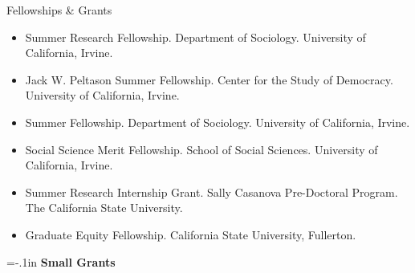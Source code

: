 \documentclass{resume} %
\newenvironment{hangt}[1]
 {\par\vspace{-\parsep}%
  \begin{itemize}[label={#1\ \quad},leftmargin=*,labelsep=0pt]
  \raggedright
  \item\relax
  \vspace*{8pt}
  }
 {\end{itemize}}
\newcommand{\datefill}{\quad \hspace{12pt}}
\begin{document}
\begin{rSection}{Fellowships \& Grants}
\begin{hangt}{2013 \datefill}
Summer Research Fellowship. Department of Sociology. University of California, Irvine. %
\end{hangt}
\begin{hangt}{2013 \datefill}
Jack W. Peltason Summer Fellowship. Center for the Study of Democracy. University of California, Irvine. %
\end{hangt}
\begin{hangt}{2013 \datefill}
Summer Fellowship. Department of Sociology. University of California, Irvine. %
\end{hangt}
\begin{hangt}{2012 \datefill}
Social Science Merit Fellowship. School of Social Sciences. University of California, Irvine. %
\end{hangt}
\begin{hangt}{2011 \datefill}
Summer Research Internship Grant. Sally Casanova Pre-Doctoral Program. The California State University. %
\end{hangt}
\begin{hangt}{2011 \datefill}
Graduate Equity Fellowship. California State University, Fullerton. 
\end{hangt}




{\parindent=-.1in {\bf Small Grants}}


\end{rSection}
\end{document}
